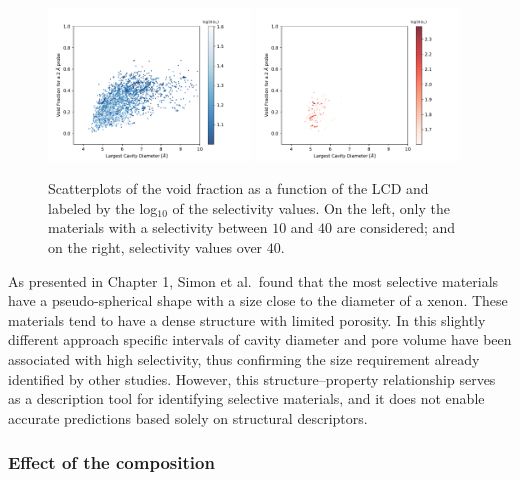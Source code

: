 \documentclass[main.tex]{subfiles}
\begin{document}
\begin{figure}[ht!]
  \centering
  \includegraphics[width=0.48\textwidth]{figures/2-thermo/Scatterplot_vf_lcd_selectivity.pdf}
  \hfill
  \includegraphics[width=0.48\textwidth]{figures/2-thermo/Scatterplot_vf_lcd_selectivity_zoom.pdf}  
  \caption{Scatterplots of the void fraction as a function of the LCD and labeled by the log$_{10}$ of the selectivity values. On the left, only the materials with a selectivity between $10$ and $40$ are considered; and on the right, selectivity values over $40$.}\label{fgr:lcd_vf}
\end{figure}


As presented in Chapter 1, Simon et al.\ found that the most selective materials have a pseudo-spherical shape with a size close to the diameter of a xenon. These materials tend to have a dense structure with limited porosity. In this slightly different approach specific intervals of cavity diameter and pore volume have been associated with high selectivity, thus confirming the size requirement already identified by other studies. However, this structure--property relationship serves as a description tool for identifying selective materials, and it does not enable accurate predictions based solely on structural descriptors. 

\subsubsection{Effect of the composition}
\end{document}
